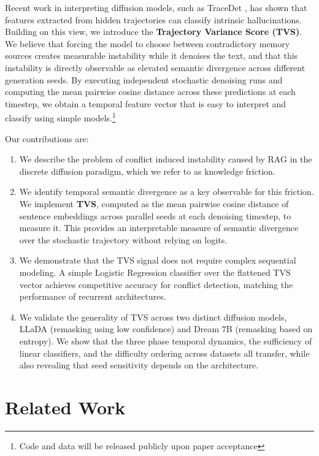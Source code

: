 \documentclass[11pt]{article}
\begin{document}
Recent work in interpreting diffusion models, such as TraceDet \citep{tracedet2025}, has shown that features extracted from hidden trajectories can classify intrinsic hallucinations. Building on this view, we introduce the \textbf{Trajectory Variance Score (TVS)}. We believe that forcing the model to choose between contradictory memory sources creates measurable instability while it denoises the text, and that this instability is directly observable as elevated semantic divergence across different generation seeds. By executing independent stochastic denoising runs and computing the mean pairwise cosine distance across these predictions at each timestep, we obtain a temporal feature vector that is easy to interpret and classify using simple models.\footnote{Code and data will be released publicly upon paper acceptance}

Our contributions are:
\begin{enumerate}
    \item We describe the problem of conflict induced instability caused by RAG in the discrete diffusion paradigm, which we refer to as knowledge friction.
    \item We identify temporal semantic divergence as a key observable for this friction. We implement \textbf{TVS}, computed as the mean pairwise cosine distance of sentence embeddings across parallel seeds at each denoising timestep, to measure it. This provides an interpretable measure of semantic divergence over the stochastic trajectory without relying on logits.
    \item We demonstrate that the TVS signal does not require complex sequential modeling. A simple Logistic Regression classifier over the flattened TVS vector achieves competitive accuracy for conflict detection, matching the performance of recurrent architectures.
    \item We validate the generality of TVS across two distinct diffusion models, LLaDA (remasking using low confidence) and Dream 7B (remasking based on entropy). We show that the three phase temporal dynamics, the sufficiency of linear classifiers, and the difficulty ordering across datasets all transfer, while also revealing that seed sensitivity depends on the architecture.
\end{enumerate}

\section{Related Work}
\end{document}
